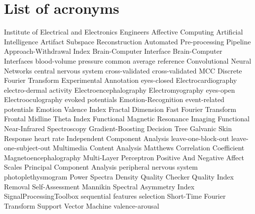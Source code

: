 \chapter{List of acronyms}

\begin{acronym}[TDMAAA]

					{Institute of Electrical and Electronics Engineers}
					{Affective Computing}	
					{Artificial Intelligence}
    		{Artifact Subspace Reconstruction}
    		{Automated Pre-processing Pipeline}
    		{Approach-Withdrawal Index}
    			   {Brain-Computer Interface}
    			   {Brain-Computer Interfaces}
    		{blood-volume pressure}
    		{common average reference}
    		{Convolutional Neural Networks}
    		{central nervous system}
    		{cross-validated}
    		{cross-validated MCC}
    		{Discrete Fourier Transform}
    		{Experimental Annotation}
    		{eyes-closed}
    				{Electrocardiography}
    		{electro-dermal activity}
    			   {Electroencephalography}
    		{Electromyography}
    		{eyes-open}
    	 	{Electrooculography}
               {evoked potentials}
    			   {Emotion-Recognition}
    		  {event-related potentials}
    		{Emotion Valence Index}
    		{Fractal Dimension}
    		{Fast Fourier Transform}
    		{Frontal Midline Theta Index}
               {Functional Magnetic Resonance Imaging}
              {Functional Near-Infrared Spectroscopy}
    		{Gradient-Boosting Decision Tree}
    		{Galvanic Skin Response}
    		{heart rate}
    		{Independent Component Analysis}
    		{leave-one-block-out}
    		{leave-one-subject-out}
    		{Multimedia Content Analysis}	
    		{Matthews Correlation Coefficient}
               {Magnetoencephalography}
    		{Multi-Layer Perceptron}
    		{Positive And Negative Affect Scales}
    		{Principal Component Analysis}
    		{peripheral nervous system}
            {photoplethysmogram}
    		{Power Spectra Density}
    		{Quality Checker}
    		{Quality Index Removal}
    		{Self-Assessment Mannikin}
    		{Spectral Asymmetry Index}
    		{SignalProcessingToolbox}
    		{sequential features selection}
       {Short-Time Fourier Transform}
    		{Support Vector Machine}
            {valence-arousal}  
    
\end{acronym}

